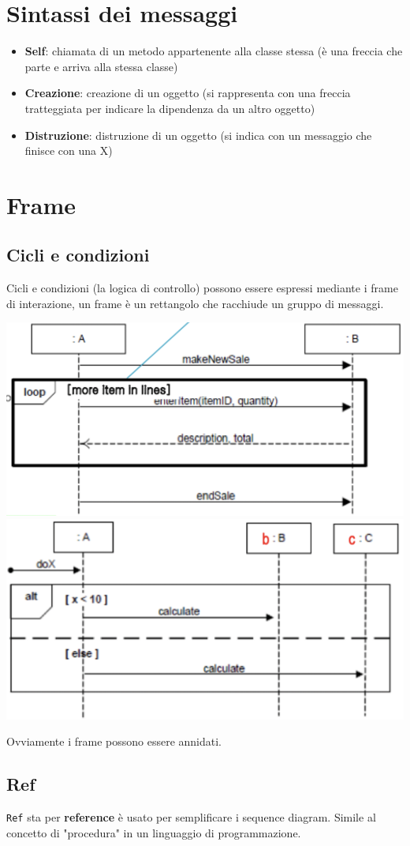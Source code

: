 \documentclass[12pt, a4paper]{report}
\begin{document}
\section{Sintassi dei messaggi}
\begin{itemize}
    \item \textbf{Self}: chiamata di un metodo appartenente alla classe stessa (è una freccia che parte e arriva alla stessa classe)
    \item \textbf{Creazione}: creazione di un oggetto (si rappresenta con una freccia tratteggiata per indicare la dipendenza da un altro oggetto)
    \item \textbf{Distruzione}: distruzione di un oggetto (si indica con un messaggio che finisce con una X)
\end{itemize}
\section{Frame}
\subsection{Cicli e condizioni}
Cicli e condizioni (la logica di controllo) possono essere espressi mediante i frame di interazione, un frame è un rettangolo che racchiude un gruppo di messaggi.
\begin{center}
    \includegraphics[width=.4\textwidth]{Immagini/loopUML.png}
    \includegraphics[width=.4\textwidth]{Immagini/ifUML.png}
\end{center}
Ovviamente i frame possono essere annidati.
\subsection{Ref}
\texttt{Ref} sta per \textbf{reference} è usato per semplificare i sequence diagram. Simile al concetto di "procedura" in un linguaggio di programmazione.
\end{document}
